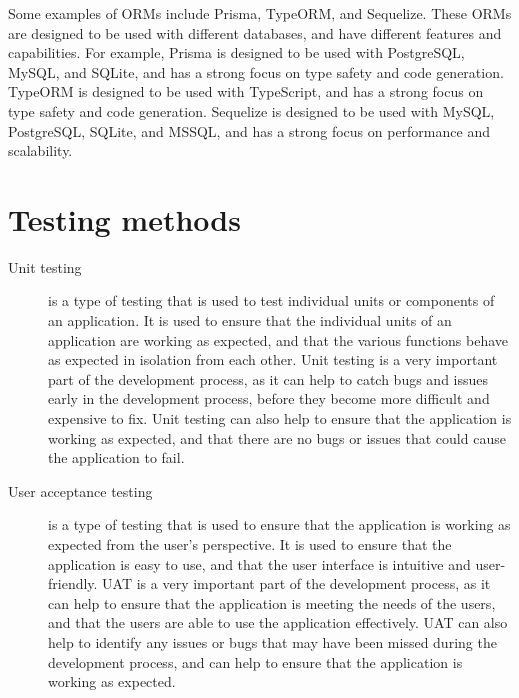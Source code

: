 \documentclass[11pt, a4paper,twoside]{report}
\theoremstyle{plain} %
\theoremstyle{definition} %
\numberwithin{equation}{chapter}
\begin{document}
Some examples of ORMs include Prisma, TypeORM, and Sequelize. These ORMs are
designed to be used with different databases, and have different features and
capabilities. For example, Prisma is designed to be used with PostgreSQL,
MySQL, and SQLite, and has a strong focus on type safety and code generation.
TypeORM is designed to be used with TypeScript, and has a strong focus on type
safety and code generation. Sequelize is designed to be used with MySQL,
PostgreSQL, SQLite, and MSSQL, and has a strong focus on performance and
scalability.\cite{orms}

\section{Testing methods}\label{sec:testingmethods}

\begin{description}
    \item[Unit testing\cite{unit-testing}] {
        is a type of testing that is used to test individual units or
        components of an application. It is used to ensure that the individual
        units of an application are working as expected, and that the various
        functions behave as expected in isolation from each other. Unit testing
        is a very important part of the development process, as it can help to
        catch bugs and issues early in the development process, before they
        become more difficult and expensive to fix. Unit testing can also help
        to ensure that the application is working as expected, and that there
        are no bugs or issues that could cause the application to fail.
        }
    \item[User acceptance testing\cite{user-testing}] {
        is a type of testing that is used to ensure that the application is
        working as expected from the user's perspective. It is used to ensure
        that the application is easy to use, and that the user interface is
        intuitive and user-friendly. UAT is a very important part of the
        development process, as it can help to ensure that the application is
        meeting the needs of the users, and that the users are able to use the
        application effectively. UAT can also help to identify any issues or
        bugs that may have been missed during the development process, and can
        help to ensure that the application is working as expected.
        }
\end{description}

\end{document}
